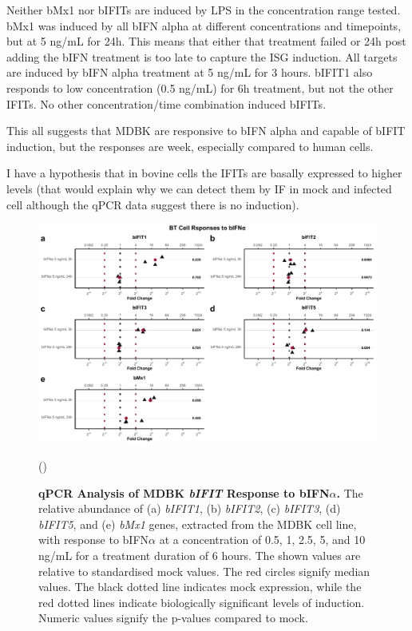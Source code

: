 Neither bMx1 nor bIFITs are induced by LPS in the concentration range tested. bMx1 was induced by all bIFN alpha at different concentrations and timepoints, but at 5 ng/mL for 24h. This means that either that treatment failed or 24h post adding the bIFN treatment is too late to capture the ISG induction. All targets are induced by bIFN alpha treatment at 5 ng/mL for 3 hours. bIFIT1 also responds to low concentration (0.5 ng/mL) for 6h treatment, but not the other IFITs. No other concentration/time combination induced bIFITs. 

This all suggests that MDBK are responsive to bIFN alpha and capable of bIFIT induction, but the responses are week, especially compared to human cells.

I have a hypothesis that in bovine cells the IFITs are basally expressed to higher levels  (that would explain why we can detect them by IF in mock and infected cell although the qPCR data suggest there is no induction).


\begin{figure}
    \centering
    \includegraphics[width=1\linewidth]{07. Chapter 2/Figs/02. Induction/08. bt_bifna.pdf}
    \caption[qPCR Analysis of BT \textit{bIFIT} Response to bIFN\(\alpha\).]{\textbf{qPCR Analysis of MDBK \textit{bIFIT} Response to bIFN\(\alpha\).} The relative abundance of (a) \textit{bIFIT1}, (b) \textit{bIFIT2}, (c) \textit{bIFIT3}, (d) \textit{bIFIT5}, and (e) \textit{bMx1} genes, extracted from the MDBK cell line, with response to bIFN\(\alpha\) at a concentration of 0.5, 1, 2.5, 5, and 10 ng/mL for a treatment duration of 6 hours. The shown values are relative to standardised mock values. The red circles signify median values. The black dotted line indicates mock expression, while the red dotted lines indicate biologically significant levels of induction. Numeric values signify the p-values compared to mock.}
    \label{fig:BT responses to bifna}

(\cite{McClurkin1974ComparisonVirus})

    
\end{figure}




